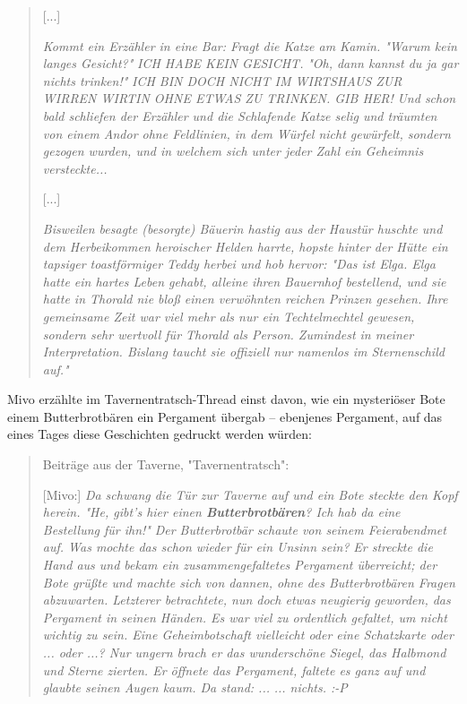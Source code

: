 \documentclass[10pt, a4paper, oneside]{book}
\begin{document}
{\begin{quote}
    [...]
    
    \textit{Kommt ein Erzähler in eine Bar: Fragt die Katze am Kamin. "Warum kein langes Gesicht?"}\newline
    \textit{ICH HABE KEIN GESICHT.}\newline
    \textit{"Oh, dann kannst du ja gar nichts trinken!"}\newline
    \textit{ICH BIN DOCH NICHT IM WIRTSHAUS ZUR WIRREN WIRTIN OHNE ETWAS ZU TRINKEN. GIB HER!}\newline
    \textit{Und schon bald schliefen der Erzähler und die Schlafende Katze selig und träumten von einem Andor ohne Feldlinien, in dem Würfel nicht gewürfelt, sondern gezogen wurden, und in welchem sich unter jeder Zahl ein Geheimnis versteckte...}

    [...]

    \textit{Bisweilen besagte (besorgte) Bäuerin hastig aus der Haustür huschte und dem Herbeikommen heroischer Helden harrte, hopste hinter der Hütte ein tapsiger toastförmiger Teddy herbei und hob hervor: "Das ist Elga. Elga hatte ein hartes Leben gehabt, alleine ihren Bauernhof bestellend, und sie hatte in Thorald nie bloß einen verwöhnten reichen Prinzen gesehen. Ihre gemeinsame Zeit war viel mehr als nur ein Techtelmechtel gewesen, sondern sehr wertvoll für Thorald als Person. Zumindest in meiner Interpretation. Bislang taucht sie offiziell nur namenlos im Sternenschild auf."}
\end{quote}

Mivo erzählte im Tavernentratsch-Thread einst davon, wie ein mysteriöser Bote einem Butterbrotbären ein Pergament übergab – ebenjenes Pergament, auf das eines Tages diese Geschichten gedruckt werden würden:

\begin{quote}
    Beiträge aus der Taverne, "Tavernentratsch":

    [Mivo:] \textit{Da schwang die Tür zur Taverne auf und ein Bote steckte den Kopf herein. "He, gibt's hier einen \textbf{Butterbrotbären}? Ich hab da eine Bestellung für ihn!"}\newline
    \textit{Der Butterbrotbär schaute von seinem Feierabendmet auf. Was mochte das schon wieder für ein Unsinn sein?}\newline
    \textit{Er streckte die Hand aus und bekam ein zusammengefaltetes Pergament überreicht; der Bote grüßte und machte sich von dannen, ohne des Butterbrotbären Fragen abzuwarten. Letzterer betrachtete, nun doch etwas neugierig geworden, das Pergament in seinen Händen. Es war viel zu ordentlich gefaltet, um nicht wichtig zu sein. Eine Geheimbotschaft vielleicht oder eine Schatzkarte oder ... oder ...? Nur ungern brach er das wunderschöne Siegel, das Halbmond und Sterne zierten. Er öffnete das Pergament, faltete es ganz auf und glaubte seinen Augen kaum. Da stand: ...}\newline
    \textit{... nichts. :-P}


\end{quote}}
\end{document}
